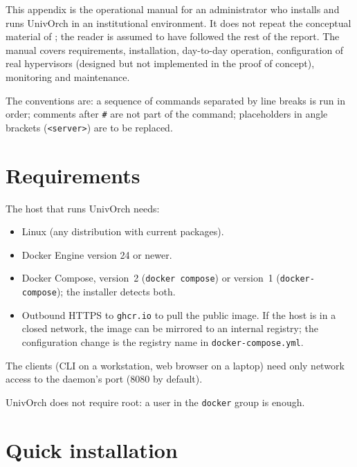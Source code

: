 
\label{ap:manual-admin}

This appendix is the operational manual for an administrator who
installs and runs UnivOrch in an institutional environment. It does
not repeat the conceptual material of ; the
reader is assumed to have followed the rest of the report. The
manual covers requirements, installation, day-to-day operation,
configuration of real hypervisors (designed but not implemented in
the proof of concept), monitoring and maintenance.

The conventions are: a sequence of commands separated by line
breaks is run in order; comments after \texttt{\#} are not part of
the command; placeholders in angle brackets
(\texttt{<server>}) are to be replaced.

\section{Requirements}

The host that runs UnivOrch needs:

\begin{itemize}
  \item Linux (any distribution with current packages).
  \item Docker Engine version 24 or newer.
  \item Docker Compose, version~2 (\texttt{docker compose}) or
        version~1 (\texttt{docker-compose}); the installer detects
        both.
  \item Outbound HTTPS to \texttt{ghcr.io} to pull the public
        image. If the host is in a closed network, the image can
        be mirrored to an internal registry; the configuration
        change is the registry name in \texttt{docker-compose.yml}.
\end{itemize}

The clients (CLI on a workstation, web browser on a laptop) need
only network access to the daemon's port (8080 by default).

UnivOrch does not require root: a user in the \texttt{docker}
group is enough.

\section{Quick installation}

